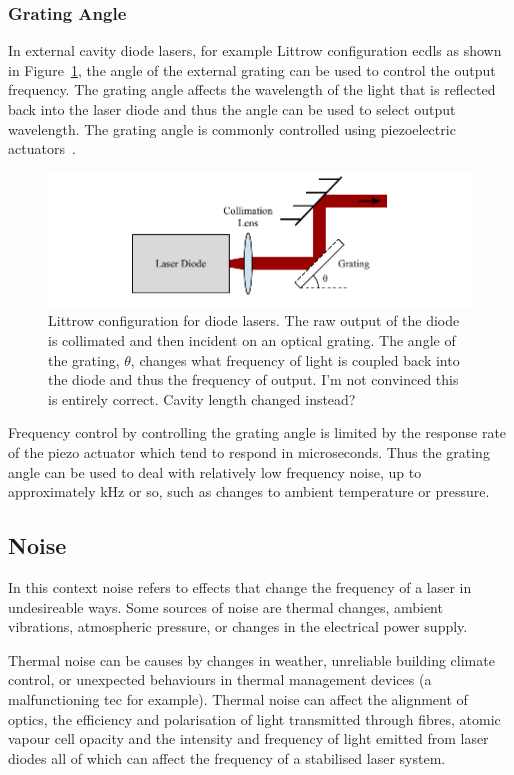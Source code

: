\subsubsection{Grating Angle}
In external cavity diode lasers, for example Littrow configuration \glspl{ecdl} as shown in Figure~\ref{figure:littrow}, the angle of the external grating can be used to control the output frequency.
The grating angle affects the wavelength of the light that is reflected back into the laser diode and thus the angle can be used to select output wavelength.
The grating angle is commonly controlled using piezoelectric actuators~\cite{hawthorn_littrow_2001}.

\begin{figure}
\includegraphics{part1/Figs/LittrowConfiguration.pdf}
\caption{Littrow configuration for diode lasers. The raw output of the diode is collimated and then incident on an optical grating. The angle of the grating, $\theta$, changes what frequency of light is coupled back into the diode and thus the frequency of output.
{\color{red}I'm not convinced this is entirely correct. Cavity length changed instead?}}
\label{figure:littrow}
\end{figure}

Frequency control by controlling the grating angle is limited by the response rate of the piezo actuator which tend to respond in microseconds.
Thus the grating angle can be used to deal with relatively low frequency noise, up to approximately \unit[100]{kHz} or so, such as changes to ambient temperature or pressure.

\subsection{Noise}
In this context noise refers to effects that change the frequency of a laser in undesireable ways.
Some sources of noise are thermal changes, ambient vibrations, atmospheric pressure, or changes in the electrical power supply.

Thermal noise can be causes by changes in weather, unreliable building climate control, or unexpected behaviours in thermal management devices (a malfunctioning \gls{tec} for example).
Thermal noise can affect the alignment of optics, the efficiency and polarisation of light transmitted through fibres, atomic vapour cell opacity and the intensity and frequency of light emitted from laser diodes all of which can affect the frequency of a stabilised laser system.

